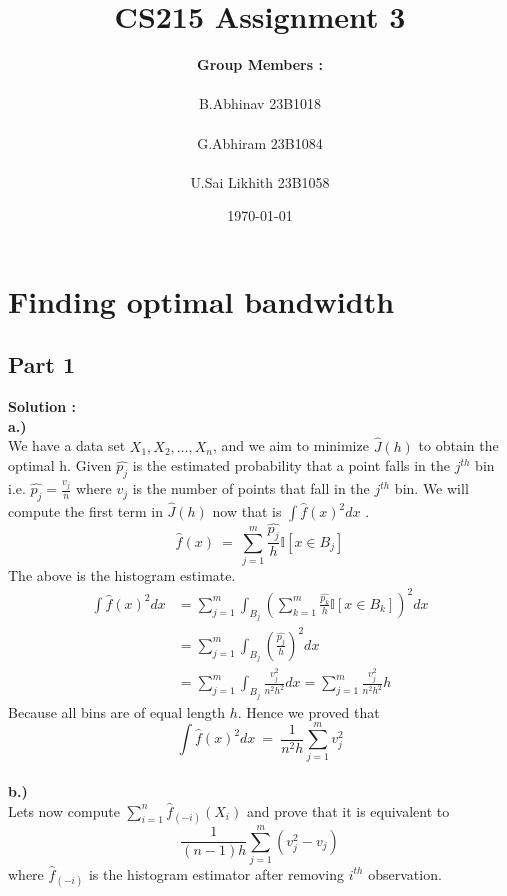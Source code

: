 \documentclass[12pt]{article}
\title{\Huge\textbf{CS215 Assignment 3}}
\author{\Large\textbf{ Group Members :} \\ \\ 
    \large B.Abhinav  23B1018 \\ \\ 
    \large G.Abhiram  23B1084 \\ \\
    \large U.Sai Likhith 23B1058 
}
\date{\today}
\begin{document}
\maketitle
\newpage

\tableofcontents
\newpage

\section{Finding optimal bandwidth}
\subsection{Part 1}
\textbf{Solution : } \\
\textbf{a.)} \\ 
We have a data set ${X_1,X_2,\dots,X_n}$,  and we aim to minimize $\hat{J}(h)$ to obtain the optimal h. Given $\hat{p_j}$ is the estimated probability that a 
point falls in the $j^{th}$ bin i.e. $\hat{p_j}=\frac{v_j}{n}$ where $v_{j}$ is the number of points that fall in the $j^{th}$ bin.
We will compute the first term in $\hat{J}(h)$ now that is $\int \hat{f}(x)^2dx$ .
\begin{equation}
    \hat{f}(x)\ =\ \sum_{j=1}^{m}\frac{\hat{p_j}}{h}\mathbb{I}[x \in B_j]
\end{equation}
The above is the histogram estimate.
\begin{equation*}
\begin{split}
    \int \hat{f}(x)^2dx &= \sum_{j=1}^{m}\int_{B_j}^{}\left(\sum_{k=1}^{m}\frac{\hat{p_k}}{h}\mathbb{I}[x \in B_k]\right)^2dx  \\
                        &= \sum_{j=1}^{m}\int_{B_j}^{}\left( \frac{\hat{p_j}}{h}\right)^2 dx \\
                        &= \sum_{j=1}^{m}\int_{B_j}^{}\frac{v_j^2}{n^2h^2}dx = \sum_{j=1}^{m}\frac{v_j^2}{n^2h^2}h 
\end{split}
\end{equation*}
Because all bins are of equal length $h$. Hence we proved that 
\begin{equation}
    \boxed{\int \hat{f}(x)^2dx\ =\  \frac{1}{n^2h}\sum_{j=1}^{m}v_j^2 }
\end{equation}
\\
\textbf{b.)} \\
Lets now compute $\sum_{i=1}^{n}\hat{f}_{(-i)}(X_i)$ and prove that it is equivalent to 
\[\frac{1}{(n-1)h}\sum_{j=1}^{m}(v_j^2-v_j)\]
where $\hat{f}_{(-i)}$ is the histogram estimator after removing $i^{th}$ observation.
\end{document}
